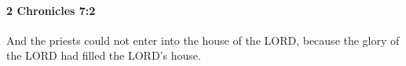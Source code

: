 
		\paragraph{2 Chronicles 7:2} %
			\label{2CHRONICLES-7-2}

			And the priests could not enter into the house of the LORD, because the glory of the LORD had filled the LORD's house.


